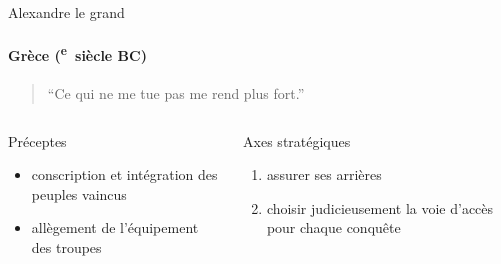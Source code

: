 \documentclass[utf8]{beamer}
\newcommand{\cRM}[1]{\MakeUppercase{\romannumeral #1}}  %
\newcommand{\siecle}[1]{\cRM{#1}\textsuperscript{e}~siècle}
\begin{document}
\begin{frame}{Alexandre le grand}
\framesubtitle{Grèce (\siecle{4} BC)}
\begin{quote}“Ce qui ne me tue pas me rend plus fort.”\end{quote}
\vfill
\begin{columns}[t]
\begin{column}{0.5\linewidth}
Préceptes
\begin{itemize}
\item conscription et intégration des peuples vaincus
\item allègement de l'équipement des troupes
\end{itemize}
\end{column}
\begin{column}{0.5\linewidth}
Axes stratégiques
\begin{enumerate}
\item assurer ses arrières
\item choisir judicieusement la voie d'accès pour chaque conquête
\end{enumerate}
\end{column}
\end{columns}
\end{frame}
\end{document}
